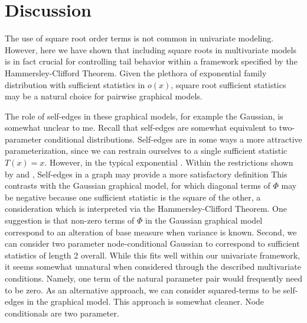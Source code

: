 \documentclass{samkoelleprelimworking}
\begin{document}
 \section{Discussion}
 
The use of square root order terms is not common in univariate modeling.  However, here we have shown that including square roots in multivariate models is in fact crucial for controlling tail behavior within a framework specified by the Hammersley-Clifford Theorem.  Given the plethora of exponential family distribution with sufficient statistics in $o(x)$, square root sufficient statistics may be a natural choice for pairwise graphical models.  

The role of self-edges in these graphical models, for example the Gaussian, is somewhat unclear to me.  Recall that self-edges are somewhat equivalent to two-parameter conditional distributions. Self-edges are in some ways a more attractive parameterization, since we can restrain ourselves to a single sufficient statistic $T(x) = x$.  However, in the typical exponential .  Within the restrictions shown by \citep{Besag1974-qb} and \citep{Yang2013-wa},  Self-edges in a graph may provide a more satisfactory definition
This contrasts with the Gaussian graphical model, for which diagonal terms of $\Phi$ may be negative because one sufficient statistic is the square of the other, a consideration which is interpreted via the Hammersley-Clifford Theorem.   One suggestion is that non-zero terms of $\Phi$ in the Gaussian graphical model correspond to an alteration of base measure when variance is known.  Second, we can consider two parameter node-conditional Gaussian to correspond to sufficient statistics of length 2 overall.  While this fits well within our univariate framework, it seems somewhat unnatural when considered through the described multivariate conditions.  Namely, one term of the natural parameter pair would frequently need to be zero.  As an alternative approach, we can consider squared-terms to be self-edges in the graphical model.  This approach is somewhat cleaner.  Node conditionals are two parameter.
\end{document}
